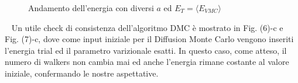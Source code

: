 \documentclass[11pt,a4paper]{article}
\begin{document}
\begin{figure}[!h]
\hspace{3mm}
\caption{Andamento dell'energia con diversi $a$ ed $E_T=\langle E_{VMC}\rangle$}
\end{figure}\
\newpage
Un utile check di consistenza dell'algoritmo DMC è mostrato in Fig. (6)-c e Fig. (7)-c, dove come input iniziale per il Diffusion Monte Carlo vengono inseriti l'energia trial ed il parametro varizionale esatti. In questo caso, come atteso, il numero di walkers non cambia mai ed anche l'energia rimane costante al valore iniziale, confermando le nostre aspettative. 
\end{document}
